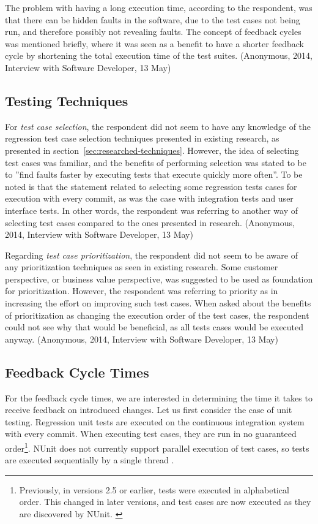 \documentclass[a4paper,english,12pt]{report}
\begin{document}
The problem with having a long execution time, according to the respondent, was that there can be hidden faults in the software, due to the test cases not being run, and therefore possibly not revealing faults. The concept of feedback cycles was mentioned briefly, where it was seen as a benefit to have a shorter feedback cycle by shortening the total execution time of the test suites. (Anonymous, 2014, Interview with Software Developer, 13 May)

\subsection{Testing Techniques}\label{sec:interview-testing-techniques}
For \textit{test case selection}, the respondent did not seem to have any knowledge of the regression test case selection techniques presented in existing research, as presented in section~\ref{sec:researched-techniques}. However, the idea of selecting test cases was familiar, and the benefits of performing selection was stated to be to ''find faults faster by executing tests that execute quickly more often''. To be noted is that the statement related to selecting some regression tests cases for execution with every commit, as was the case with integration tests and user interface tests. In other words, the respondent was referring to another way of selecting test cases compared to the ones presented in research. (Anonymous, 2014, Interview with Software Developer, 13 May)

Regarding \textit{test case prioritization}, the respondent did not seem to be aware of any prioritization techniques as seen in existing research. Some customer perspective, or business value perspective, was suggested to be used as foundation for prioritization. However, the respondent was referring to priority as in increasing the effort on improving such test cases. When asked about the benefits of prioritization as changing the execution order of the test cases, the respondent could not see why that would be beneficial, as all tests cases would be executed anyway. (Anonymous, 2014, Interview with Software Developer, 13 May)

\subsection{Feedback Cycle Times}\label{sec:project-cycle-times}
For the feedback cycle times, we are interested in determining the time it takes to receive feedback on introduced changes. Let us first consider the case of unit testing. Regression unit tests are executed on the continuous integration system with every commit. When executing test cases, they are run in no guaranteed order\footnote{Previously, in versions 2.5 or earlier, tests were executed in alphabetical order. This changed in later versions, and test cases are now executed as they are discovered by NUnit. \citep{poole2012test}}. NUnit does not currently support parallel execution of test cases, so tests are executed sequentially by a single thread \citep{poole2013parallel}. 
\end{document}
